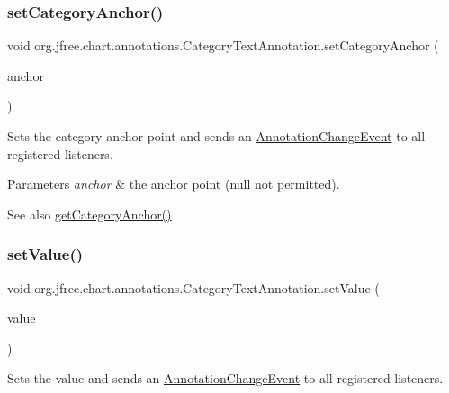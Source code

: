 \subsubsection{\texorpdfstring{set\+Category\+Anchor()}{setCategoryAnchor()}}
{\footnotesize\ttfamily void org.\+jfree.\+chart.\+annotations.\+Category\+Text\+Annotation.\+set\+Category\+Anchor (\begin{DoxyParamCaption}\item[{\mbox{\hyperlink{classorg_1_1jfree_1_1chart_1_1axis_1_1_category_anchor}{Category\+Anchor}}}]{anchor }\end{DoxyParamCaption})}

Sets the category anchor point and sends an \mbox{\hyperlink{}{Annotation\+Change\+Event}} to all registered listeners.


\begin{DoxyParams}{Parameters}
{\em anchor} & the anchor point ({\ttfamily null} not permitted).\\
\hline
\end{DoxyParams}
\begin{DoxySeeAlso}{See also}
\mbox{\hyperlink{classorg_1_1jfree_1_1chart_1_1annotations_1_1_category_text_annotation_a81b944db09089455549d298b78a8619e}{get\+Category\+Anchor()}} 
\end{DoxySeeAlso}
\mbox{\label{classorg_1_1jfree_1_1chart_1_1annotations_1_1_category_text_annotation_afded63ce4398edd0bf3a20324eef26f7}} 
\subsubsection{\texorpdfstring{set\+Value()}{setValue()}}
{\footnotesize\ttfamily void org.\+jfree.\+chart.\+annotations.\+Category\+Text\+Annotation.\+set\+Value (\begin{DoxyParamCaption}\item[{double}]{value }\end{DoxyParamCaption})}

Sets the value and sends an \mbox{\hyperlink{}{Annotation\+Change\+Event}} to all registered listeners.


